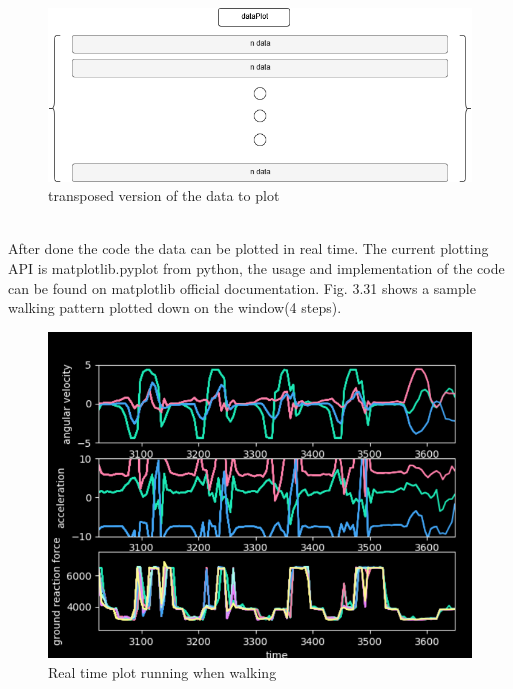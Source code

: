\documentclass[12 pt, a4paper]{thesis}
\begin{document}
\begin{figure}[hbt!]
\centering
\includegraphics[width=120mm]{dataPlot.png}
\caption{transposed version of the data to plot}
\end{figure}
\\After done the code the data can be plotted in real time. The current plotting API is matplotlib.pyplot from python, the usage and implementation of the code can be found on matplotlib official documentation. Fig. 3.31 shows a sample walking pattern plotted down on the window(4 steps).
\begin{figure}
\centering
\includegraphics[width = 140mm]{walking.png}
\caption{Real time plot running when walking}
\end{figure}
\end{document}
